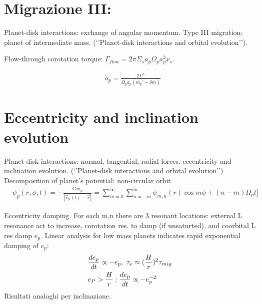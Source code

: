 \section{Migrazione III:}
Planet-disk interactions: exchange of angular momentum. Type III migration: planet of intermediate mass. (‘’Planet-disk interactions and orbital evolution’’).

Flow-through corotation torque: $\Gamma_{flow}=2\pi\Sigma_s\dot{a}_p\Omega_pa_p^3x_s$.

\begin{align*}
&\dot{a}_p=\frac{2\Gamma^L}{\Omega_pa_p(m_p’-\delta m)}
\end{align*}

\section{Eccentricity and inclination evolution}
Planet-disk interactions: normal, tangential, radial forces. eccentricity and inclination evolution. (‘’Planet-disk interactions and orbital evolution’’)
Decomposition of planet’s potential: non-circular orbit
\begin{align*}
&\psi_p(r,\phi,t)=-\frac{Gm_p}{|\vec{r}_p(t)-\vec{r}|}=\sum_{m=0}^{\infty}\sum_{n=-m}^m\psi_{m,n}(r)\cos{m\phi+(n-m)\Omega_pt]}
\end{align*}

Eccentricity damping.
For each m,n there are 3 resonant locations: external L resonance act to increase, corotation res. to damp (if unsaturted), and coorbital L res damp $e_p$. Linear analysis for low mass planets indicates rapid exponential damping of $e_p$:
\begin{align*}
&\TDy{t}{e_p}\propto-e_p,\ \tau_e\approx(\frac{H}{r})^2\tau_{mig}\\
&e_P>\frac{H}{r}: \TDy{t}{e_p}\propto-e_p\expy{-2}
\end{align*}
Risultati analoghi per inclinazione.
